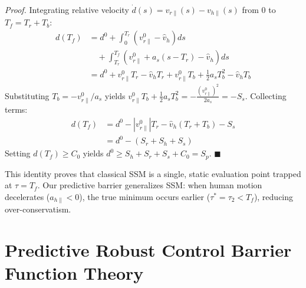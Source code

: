 \documentclass[10pt,twocolumn,a4paper]{article}
\begin{document}
\textit{Proof.} Integrating relative velocity $\dot{d}(s) = v_{r\parallel}(s) - v_{h\parallel}(s)$ from $0$ to $T_f = T_r + T_b$:
\begin{align}
d(T_f) &= d^0 + \int_0^{T_r} (v_{r\parallel}^0 - \hat{v}_h) ds \nonumber\\
&\quad + \int_{T_r}^{T_f} (v_{r\parallel}^0 + a_s(s - T_r) - \hat{v}_h) ds \nonumber\\
&= d^0 + v_{r\parallel}^0 T_r - \hat{v}_h T_r + v_{r\parallel}^0 T_b + \frac{1}{2} a_s T_b^2 - \hat{v}_h T_b
\end{align}
Substituting $T_b = -v_{r\parallel}^0 / a_s$ yields $v_{r\parallel}^0 T_b + \frac{1}{2} a_s T_b^2 = -\frac{(v_{r\parallel}^0)^2}{2 a_s} = -S_s$. Collecting terms:
\begin{align}
d(T_f) &= d^0 - |v_{r\parallel}^0| T_r - \hat{v}_h (T_r + T_b) - S_s \nonumber\\
&= d^0 - (S_r + S_h + S_s)
\end{align}
Setting $d(T_f) \ge C_0$ yields $d^0 \ge S_h + S_r + S_s + C_0 = S_p$. \hfill $\blacksquare$

This identity proves that classical SSM is a single, static evaluation point trapped at $\tau = T_f$. Our predictive barrier generalizes SSM: when human motion decelerates ($a_{h\parallel} < 0$), the true minimum occurs earlier ($\tau^* = \tau_2 < T_f$), reducing over-conservatism.

\section{Predictive Robust Control Barrier Function Theory}
\end{document}
